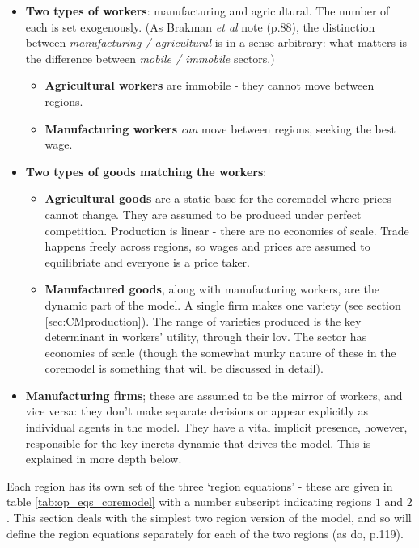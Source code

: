 \begin{itemize}
	\item \textbf{Two types of workers}: manufacturing and agricultural. The number of each is set exogenously. (As Brakman \emph{et al} note (p.88), the distinction between \emph{manufacturing / agricultural} is in a sense arbitrary: what matters is the difference between \emph{mobile / immobile} sectors.)
		\begin{itemize}
			\item \textbf{Agricultural workers} are immobile - they cannot move between regions.  
			\item \textbf{Manufacturing workers} \emph{can} move between regions, seeking the best wage.
		\end{itemize}	
	\item \textbf{Two types of goods matching the workers}:
		\begin{itemize}
			\item \textbf{Agricultural goods} are a static base for the \gls{coremodel} where prices cannot change. They are assumed to be produced under perfect competition. Production is linear - there are no economies of scale. Trade happens freely across regions, so wages and prices are assumed to equilibriate and everyone is a price taker.
			\item \textbf{Manufactured goods}, along with manufacturing workers, are the dynamic part of the model. A single firm makes one variety (see section \ref{sec:CMproduction}). The range of varieties produced is the key determinant in workers' utility, through their \gls{lov}. The sector has economies of scale (though the somewhat murky nature of these in the \gls{coremodel} is something that will be discussed in detail). 
		\end{itemize}
	\item \textbf{Manufacturing firms}; these are assumed to be the mirror of workers, and vice versa: they don't make separate decisions or appear explicitly as individual agents in the model. They have a vital implicit presence, however, responsible for the key \gls{increts} dynamic that drives the model. This is explained in more depth below.
\end{itemize}

Each region has its own set of the three `region equations' - these are given in table \ref{tab:op_eqs_coremodel} with a number subscript indicating regions $1$ and $2$. This section deals with the simplest two region version of the model, and so will define the region equations separately for each of the two regions (as \citeauthor{brakman_new_2009} do, p.119). 

